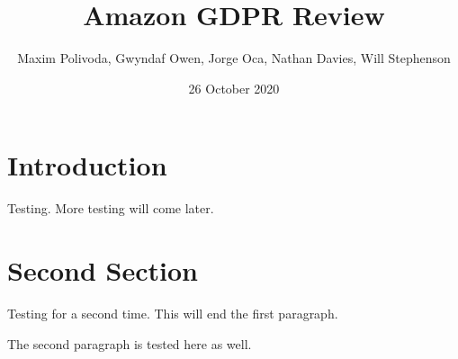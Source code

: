 \documentclass{article}
\begin{document}
\title{Amazon GDPR Review}
\author{Maxim Polivoda, Gwyndaf Owen, Jorge Oca, Nathan Davies, Will Stephenson}
\date{26 October 2020}

\maketitle


\section{Introduction}
Testing. More testing will come later.

\section{Second Section}
Testing for a second time. This will end the first paragraph.

The second paragraph is tested here as well.
\end{document}
